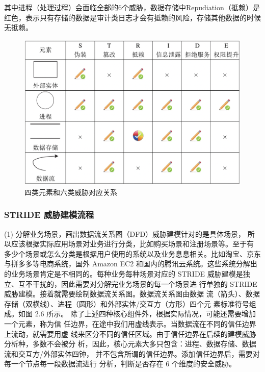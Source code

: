 其中进程（处理过程）会面临全部的6个威胁，数据存储中Repudiation（抵赖）是红色，表示只有存储的数据是审计类日志才会有抵赖的风险，存储其他数据的时候无抵赖。
\begin{figure}
    \centering
    \includegraphics[scale=0.6]{resources/img/i77.png}
    \caption{四类元素和六类威胁对应关系}
  \end{figure}

\subsubsection{STRIDE 威胁建模流程}
(1) 分解业务场景，画出数据流关系图（DFD）威胁建模针对的是具体场景，
所以应该根据实际应用场景对业务进行分类，比如购买场景和注册场景等。至于有
多少个场景或怎么分类是根据用户使用的系统以及业务息息相关。比如淘宝、京东
与拼多多等电商系统，国外 Amazon EC2 和国内的腾讯云系统。这些系统分解出的业务场景肯定是不相同的。每种业务每种场景对应的
STRIDE 威胁建模是独立、互不干扰的，因此需要对分解完业务场景的每一个场景进
行单独的 STRIDE 威胁建模。接着就需要绘制数据流关系图。数据流关系图由数据
流（箭头）、数据存储（双横线）、进程（圆形）和外部实体/交互方（方形）四个元
素标准符号组成。如图 2.6 所示。
除了上述四种核心组件外，根据实际情况，可能还需要增加一个元素，称为信
任边界，在途中我们用虚线表示。当数据流在不同的信任边界上流动，就需要用虚
线来区分不同的信任区域。由于信任边界在后续的建模威胁分析种，多数不会被分
析，因此，核心元素大多只包含：进程、数据存储、数据流和交互方/外部实体四钟，
并不包含所谓的信任边界。添加信任边界后，需要对每一个节点每一段数据流进行
分析，判断是否存在 6 个维度的安全威胁。

